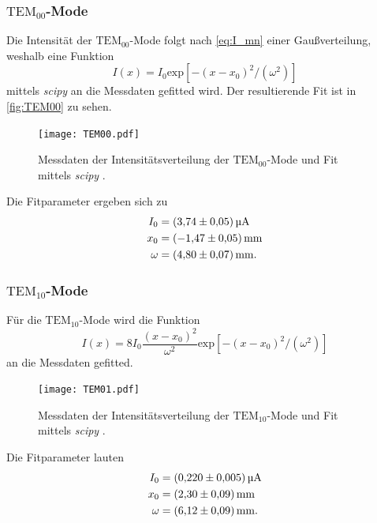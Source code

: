 \subsubsection{$\text{TEM}_{00}$-Mode}

Die Intensität der $\text{TEM}_{00}$-Mode folgt nach \autoref{eq:I_mn} einer Gaußverteilung, weshalb eine Funktion
\begin{equation*}
  I(x) = I_0 \text{exp}\left[-(x-x_0)^2/(\omega^2)\right]
\end{equation*}
mittels \textit{scipy} \cite{scipy} an die Messdaten gefitted wird.
Der resultierende Fit ist in \autoref{fig:TEM00} zu sehen.
\begin{figure}
  \centering
  \texttt{[image: TEM00.pdf]}
  \caption{Messdaten der Intensitätsverteilung der $\text{TEM}_{00}$-Mode und Fit mittels \textit{scipy} \cite{scipy}.}
  \label{fig:TEM00}
\end{figure}

Die Fitparameter ergeben sich zu 
\begin{align*}
  I_0 &= \qty{3.74 +- 0.05}{\micro\ampere} \\
  x_0 &= \qty{-1.47 +- 0.05}{\milli\metre} \\
  \omega &= \qty{4.80 +- 0.07}{\milli\metre}.
\end{align*}

\subsubsection{$\text{TEM}_{10}$-Mode}

Für die $\text{TEM}_{10}$-Mode wird die Funktion
\begin{equation*}
  I(x) = 8I_0\frac{(x-x_0)^2}{\omega^2} \text{exp}\left[-(x-x_0)^2/(\omega^2)\right]
\end{equation*}
an die Messdaten gefitted.
\begin{figure}
  \centering
  \texttt{[image: TEM01.pdf]}
  \caption{Messdaten der Intensitätsverteilung der $\text{TEM}_{10}$-Mode und Fit mittels \textit{scipy} \cite{scipy}.}
  \label{fig:TEM01}
\end{figure}
Die Fitparameter lauten
\begin{align*}
  I_0 &= \qty{0.22 +- 0.005}{\micro\ampere} \\
  x_0 &= \qty{2.30 +- 0.09}{\milli\metre} \\
  \omega &= \qty{6.12 +- 0.09}{\milli\metre}.
\end{align*}

